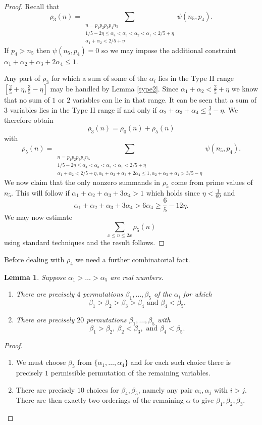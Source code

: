 \documentclass[12pt]{amsart}
\theoremstyle{plain}
\newtheorem{lem}{Lemma}
\theoremstyle{definition}
\numberwithin{equation}{section}
\def \a{\alpha} \def \b{\beta} \def \d{\delta} \def \e{\varepsilon} \def \g{\gamma} \def \k{\kappa} \def \l{\lambda} \def \s{\sigma} \def \t{\theta} \def \z{\zeta}
\newcommand{\threesum}[3]{\sum_{\substack{#1\\#2\\#3}}}
\begin{document}
\begin{proof}
Recall that 
$$\rho_3(n)=\threesum{n=p_1p_2p_3p_4n_5}{1/5-2\eta\leq \a_4<\a_3<\a_2<\a_1< 2/5+\eta}{\a_1+\a_2<2/5+\eta}\psi(n_5,p_4).$$
If $p_4>n_5$ then $\psi(n_5,p_4)=0$ so we may impose the additional constraint $\a_1+\a_2+\a_3+2\a_4\leq 1$.  

Any part of $\rho_3$ for which a sum of some of the $\a_i$ lies in the Type II range $[\frac25+\eta,\frac35-\eta]$ may be handled by Lemma \ref{type2}.  Since $\a_1+\a_2<\frac25+\eta$ we know that no sum of $1$ or $2$ variables can lie in that range.  It can be seen that a sum of $3$ variables lies in the Type II range if and only if $\a_2+\a_3+\a_4\leq \frac35-\eta$.  We therefore obtain 
$$\rho_3(n)=\rho_0(n)+\rho_5(n)$$
with 
$$\rho_5(n)=\threesum{n=p_1p_2p_3p_4n_5}{1/5-2\eta\leq \a_4<\a_3<\a_2<\a_1< 2/5+\eta}{\a_1+\a_2<2/5+\eta,\a_1+\a_2+\a_3+2\a_4\leq 1,\a_2+\a_3+\a_4>3/5-\eta}\psi(n_5,p_4).$$
We now claim that the only nonzero summands in $\rho_5$ come from prime values of $n_5$.  This will follow if $\a_1+\a_2+\a_3+3\a_4>1$ which holds since $\eta<\frac{1}{60}$ and  
$$\a_1+\a_2+\a_3+3\a_4>6\a_4\geq \frac65-12\eta.$$
We may now estimate 
$$\sum_{x\leq n\leq 2x}\rho_5(n)$$
using standard techniques and the result follows.  
\end{proof}

Before dealing with $\rho_4$ we need a further combinatorial fact.

\begin{lem}\label{permlem}
Suppose $\a_1>\ldots>\a_5$ are real numbers.

\begin{enumerate}
\item There are precisely $4$ permutations $\b_1,\ldots,\b_5$ of the $\a_i$ for which 
$$\b_1>\b_2>\b_3>\b_4\text{ and }\b_4<\b_5.$$

\item There are precisely $20$ permutations $\b_1,\ldots,\b_5$ with 
$$\b_1>\b_2,\ \b_2<\b_3,\text{ and }\b_4<\b_5.$$
\end{enumerate}
\end{lem}

\begin{proof}
  \begin{enumerate}
  \item We must choose $\b_5$ from $\{\a_1,\ldots,\a_4\}$ and for each such choice there is precisely $1$ permissible permutation of the remaining variables.

\item There are precisely $10$ choices for $\b_4,\b_5$, namely any pair $\a_i,\a_j$ with $i>j$.  There are then exactly two orderings of the remaining $\a$ to give $\b_1,\b_2,\b_3$.  
  \end{enumerate}
\end{proof}
\end{document}
